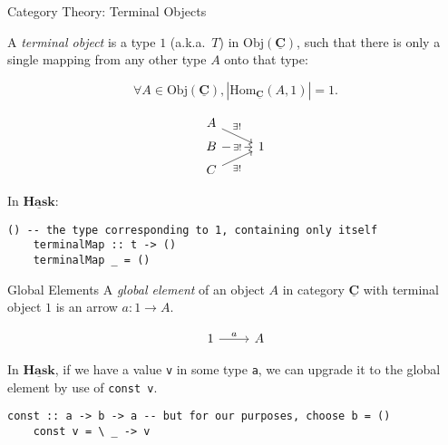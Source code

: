 \documentclass[10pt]{beamer}
\newcommand{\Cat}[1]{\ensuremath{\underline{\mathbf{#1}}}}
\newcommand{\Obj}[1]{\ensuremath{\mathrm{Obj}(\Cat{#1})}}
\newcommand{\Hom}[3]{\ensuremath{\mathrm{Hom}_{\Cat{#1}}(#2,#3)}}
\theoremstyle{definition}
\theoremstyle{remark}
\numberwithin{equation}{section}
\begin{document}
\begin{frame}[fragile]{Category Theory: Terminal Objects}

  A \emph{terminal object} is a type $1$ (a.k.a.\ $T$) in $\Obj{C}$, such that there is only a single mapping from any other type $A$ onto that type:

  \[
    \forall A\in \Obj{C}, \left| \Hom{C}{A}{1} \right| = 1.
  \]

  \[
    \begin{tikzcd}[row sep=tiny]
      A \arrow[near start]{dr}{\exists!} & \\
      B \arrow["\exists!" description]{r} & 1\\
      C \arrow[swap,near start]{ur}{\exists!} & 
    \end{tikzcd}
  \]
  

  In \Cat{Hask}:
  \begin{lstlisting}[frame=single]
    () -- the type corresponding to 1, containing only itself
    terminalMap :: t -> ()
    terminalMap _ = ()
  \end{lstlisting}

\end{frame}

\begin{frame}{Global Elements}
  A \emph{global element} of an object $A$ in category $\Cat{C}$ with terminal object $1$ is an arrow $a : 1 \rightarrow A$.\vspace{-\baselineskip}
  
  \[
  \begin{tikzcd}
    1 \arrow{r}{a} & A
  \end{tikzcd}
  \]

  In \Cat{Hask}, if we have a value \lstinline{v} in some type \lstinline{a}, we
  can upgrade it to the global element by use of \lstinline{const v}.

  \begin{lstlisting}[frame=single]
    const :: a -> b -> a -- but for our purposes, choose b = ()
    const v = \ _ -> v
  \end{lstlisting}

\end{frame}
\end{document}
